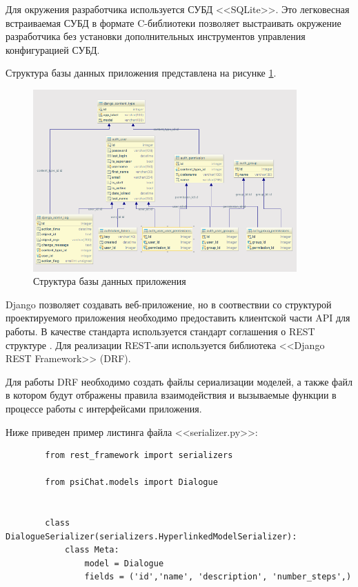 Для окружения разработчика используется СУБД <<SQLite>>. Это легковесная встраиваемая СУБД в формате C-библиотеки позволяет выстраивать окружение разработчика без установки дополнительных инструментов управления конфигурацией СУБД.

Структура базы данных приложения представлена на рисунке \ref{fig:db}.

\begin{figure}[H]
    \centering
    \includegraphics[width=0.9\textwidth]{image/db_diagram.png}
    \caption{Структура базы данных приложения}
    \label{fig:db}
\end{figure}

Django позволяет создавать веб-приложение, но в соотвествии со структурой проектируемого приложения необходимо предоставить клиентской части API для работы. В качестве стандарта используется стандарт соглашения о REST структуре \cite{richardson2008restful}. Для реализации  REST-апи используется библиотека <<Django REST Framework>> (DRF). 

Для работы DRF необходимо создать файлы сериализации моделей, а также файл в котором будут отбражены правила взаимодействия и вызываемые функции в процессе работы с интерфейсами приложения. 

Ниже приведен пример листинга файла <<serializer.py>>:

\begin{minipage}{0.9\textwidth}
        \begin{verbatim}
        from rest_framework import serializers

        from psiChat.models import Dialogue
        
        
        class DialogueSerializer(serializers.HyperlinkedModelSerializer):
            class Meta:
                model = Dialogue
                fields = ('id','name', 'description', 'number_steps',)

        \end{verbatim}
\end{minipage}\\[1.5pt]

